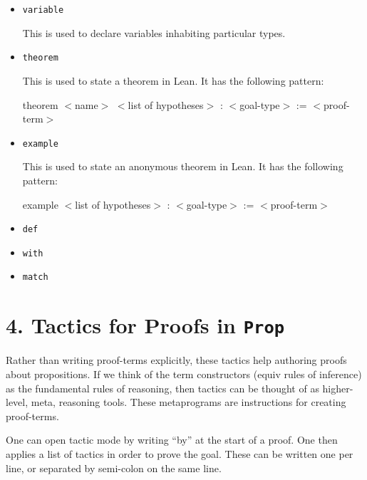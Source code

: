 \documentclass[12pt]{article}
\begin{document}
\begin{itemize}
  \item \texttt{variable}
  
  	This is used to declare variables inhabiting particular types.
  
  \item \texttt{theorem}
  
  	This is used to state a theorem in Lean. It has the following pattern:
  	
  	theorem $<$name$>$ $<$list of hypotheses$>$ : $<$goal-type$>$ := $<$proof-term$>$
  
  \item \texttt{example}
  
  This is used to state an anonymous theorem in Lean. It has the following pattern:
  	
  	example $<$list of hypotheses$>$ : $<$goal-type$>$ := $<$proof-term$>$
  
   \item \texttt{def}
  
  \item \texttt{with}
  \item \texttt{match}
\end{itemize}

\vspace{0.5cm}

\section*{4. Tactics for Proofs in \texttt{Prop}}
Rather than writing proof-terms explicitly, these tactics help authoring proofs about propositions. If we think of the term constructors (equiv rules of inference) as the fundamental rules of reasoning, then tactics can be thought of as higher-level, meta, reasoning tools. These metaprograms are instructions for creating proof-terms. 

One can open tactic mode by writing ``by'' at the start of a proof. One then applies a list of tactics in order to prove the goal. These can be written one per line, or separated by semi-colon on the same line.
\end{document}
